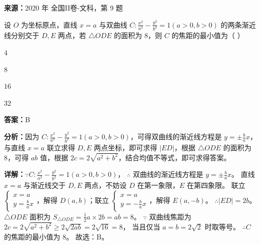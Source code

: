 \begin{question}[points=5]
\textbf{来源：}2020 年 全国II卷-文科，第 9 题\par
设 $O$ 为坐标原点，直线 $x=a$ 与双曲线 $C:\frac{x^2}{a^2}-\frac{y^2}{b^2}=1(a>0,b>0)$ 的两条渐近线分别交于 $D, E$ 两点，若 $\triangle ODE$ 的面积为 $8$，则 $C$ 的焦距的最小值为（ ）
\begin{choices}
  \item $4$
  \item $8$
  \item $16$
  \item $32$
\end{choices}
\begin{solution}
\textbf{答案：}B

\textbf{分析：}因为 $C:\frac{x^2}{a^2}-\frac{y^2}{b^2}=1(a>0,b>0)$，可得双曲线的渐近线方程是 $y=\pm\frac{b}{a}x$，与直线 $x=a$ 联立求得 $D, E$ 两点坐标，即可求得 $|ED|$，根据 $\triangle ODE$ 的面积为 $8$，可得 $ab$ 值，根据 $2c=2\sqrt{a^2+b^2}$，结合均值不等式，即可求得答案。

\textbf{详解：}$\because C: \frac{x^2}{a^2}-\frac{y^2}{b^2}=1(a>0,b>0)$，
$\therefore$ 双曲线的渐近线方程是 $y=\pm\frac{b}{a}x$。
直线 $x=a$ 与渐近线交于 $D, E$ 两点，不妨设 $D$ 在第一象限，$E$ 在第四象限。
联立 $\begin{cases} x=a \\ y=\frac{b}{a}x \end{cases}$，解得 $D(a,b)$；联立 $\begin{cases} x=a \\ y=-\frac{b}{a}x \end{cases}$，解得 $E(a,-b)$。
$\therefore |ED|=2b$。
$\triangle ODE$ 面积为 $S_{\triangle ODE} = \frac{1}{2} a \times 2b = ab = 8$。
$\because$ 双曲线焦距为 $2c = 2\sqrt{a^2+b^2} \ge 2\sqrt{2ab} = 2\sqrt{16} = 8$，
当且仅当 $a=b=2\sqrt{2}$ 时取等号。
$\therefore C$ 的焦距的最小值为 $8$。
故选：B。
\end{solution}
\end{question}

